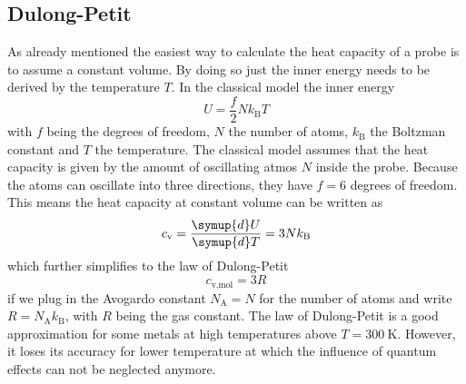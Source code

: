 \subsection{Dulong-Petit}
As already mentioned the easiest way to calculate the heat capacity of a probe is to assume a constant volume.
By doing so just the inner energy needs to be derived by the temperature $T$.
In the classical model the inner energy
\begin{equation*}
    U = \frac{f}{2}Nk_\text{B}T
\end{equation*}
with $f$ being the degrees of freedom, $N$ the number of atoms, $k_\text{B}$ the Boltzman constant and $T$ the temperature.
The classical model assumes that the heat capacity is given by the amount of oscillating atmos $N$ inside the probe.
Because the atoms can oscillate into three directions, they have $f=6$ degrees of freedom.
This means the heat capacity at constant volume can be written as 
\begin{equation*}
    c_\text{v} = \frac{\symup{d}U}{\symup{d}T} = 3Nk_\text{B}
\end{equation*}
which further simplifies to the law of Dulong-Petit
\begin{equation}
    c_\text{v,mol} = 3R
    \label{eq:dulong}
\end{equation}
if we plug in the Avogardo constant $N_\text{A} = N$ for the number of atoms and write $R = N_\text{A} k_\text{B}$, with $R$ being the gas constant.
The law of Dulong-Petit is a good approximation for some metals at high temperatures above $T = \SI{300}{\K}$.
However, it loses its accuracy for lower temperature at which the influence of quantum effects can not be neglected anymore.
